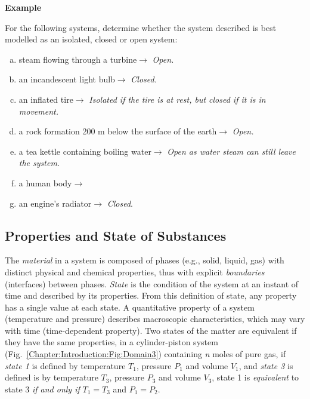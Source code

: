\medskip
\begin{MyExample}{\begin{center}{\bf Example}\end{center}}
\begin{example}\label{Chapter:Introduction:Example1}
  \citep{Reisel_Book} For the following systems, determine whether the system described is best modelled as an isolated, closed or open system:
  \begin{enumerate}[a)]
     \item steam flowing through a turbine\;\;$\rightarrow$\;\; {\it Open.}
     \item an incandescent light bulb\;\;$\rightarrow$\;\; {\it Closed.}
     \item an inflated tire\;\;$\rightarrow$\;\; {\it Isolated if the tire is at rest, but closed if it is in movement.}
     \item a rock formation 200 m below the surface of the earth\;\;$\rightarrow$\;\; {\it Open.}
     \item a tea kettle containing boiling water\;\;$\rightarrow$\;\; {\it Open as water steam can still leave the system.}
     \item a human body\;\;$\rightarrow$\;
     \item an engine's radiator\;\;$\rightarrow$\;\; {\it Closed}.
  \end{enumerate}
\end{example}
\end{MyExample}

   \subsection{Properties and State of Substances}\label{Chapter:Introduction:Section:Introduction:ExtensiveIntensiveProperties}
   The {\it material} in a system is composed of phases (e.g., solid, liquid, gas) with distinct physical and chemical properties, thus with explicit {\it boundaries} (\ie interfaces) between phases. {\it State} is the condition of the system at an instant of time and described by its properties.  From this definition of state, any property has a single value at each state. A quantitative property of a system (\eg temperature and pressure) describes macroscopic characteristics, which may vary with time (\ie time-dependent property). Two states of the matter are equivalent if they have the same properties, \eg in a cylinder-piston system (Fig.~\ref{Chapter:Introduction:Fig:Domain3}) containing {\it n} moles of pure gas, if {\it state 1} is defined by temperature $T_{1}$, pressure $P_{1}$ and volume $V_{1}$, and {\it state 3} is defined is by temperature $T_{3}$, pressure $P_{3}$ and volume $V_{3}$, state 1 is {\it equivalent} to state 3 {\it if and only if} $T_{1} = T_{3}$ and $P_{1} = P_{2}$. 
\medskip

